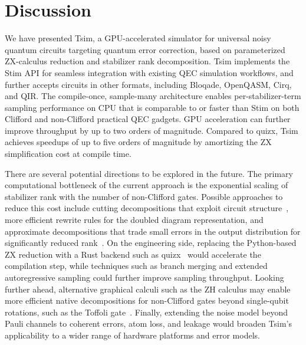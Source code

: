 \documentclass[
  a4paper,
  onecolumn,
  11pt,
  allowtoday
]{quantumarticle}
\begin{document}

\section{Discussion}
\label{sec:summary}

We have presented Tsim, a GPU-accelerated simulator for universal noisy quantum circuits targeting quantum error correction, based on parameterized ZX-calculus reduction and stabilizer rank decomposition. Tsim implements the Stim API for seamless integration with existing QEC simulation workflows, and further accepts circuits in other formats, including Bloqade, OpenQASM, Cirq, and QIR. The compile-once, sample-many architecture enables per-stabilizer-term sampling performance on CPU that is comparable to or faster than Stim on both Clifford and non-Clifford practical QEC gadgets. GPU acceleration can further improve throughput by up to two orders of magnitude. Compared to quizx, Tsim achieves speedups of up to five orders of magnitude by amortizing the ZX simplification cost at compile time.

There are several potential directions to be explored in the future.
The primary computational bottleneck of the current approach is the exponential scaling of stabilizer rank with the number of non-Clifford gates. Possible approaches to reduce this cost include cutting decompositions that exploit circuit structure~\cite{wan2025cutting,wan2026simulatingmagicstatecultivation}, more efficient rewrite rules for the doubled diagram representation, and approximate decompositions that trade small errors in the output distribution for significantly reduced rank~\cite{bravyi2019simulation}. On the engineering side, replacing the Python-based ZX reduction with a Rust backend such as quizx~\cite{kissinger2022classical} would accelerate the compilation step, while techniques such as branch merging and extended autoregressive sampling could further improve sampling throughput. Looking further ahead, alternative graphical calculi such as the ZH calculus may enable more efficient native decompositions for non-Clifford gates beyond single-qubit rotations, such as the Toffoli gate~\cite{backens2019zhcomplete}. Finally, extending the noise model beyond Pauli channels to coherent errors, atom loss, and leakage would broaden Tsim's applicability to a wider range of hardware platforms and error models.
\end{document}
